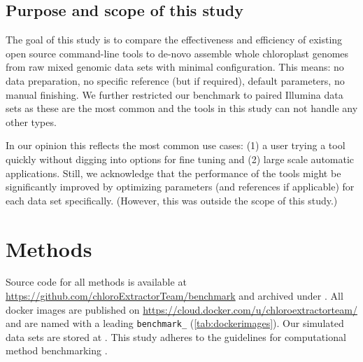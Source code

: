 \documentclass{bmcart}
\newcommand{\zenododataset}{\cite{zenododataset}}
\newcommand{\zenodorepo}{\cite{zenodorepo}}
\begin{document}
\subsection*{Purpose and scope of this study}
The goal of this study is to compare the effectiveness and efficiency of existing open source command-line tools to de-novo assemble whole chloroplast genomes from raw mixed genomic data sets with minimal configuration.
This means: no data preparation, no specific reference (but  if required), default parameters, no manual finishing.
We further restricted our benchmark to paired Illumina data sets as these are the most common  and the %
tools in this study can not handle any other types. 

In our opinion this reflects the most common use cases: (1) a user trying a tool quickly without digging into options for fine tuning and (2) large scale automatic applications.
Still, we acknowledge that the performance of the tools might be significantly improved by optimizing parameters (and references if applicable) for each data set specifically.
(However, this was outside the scope of this study.)


\section*{Methods}
Source code for all methods is available at \url{https://github.com/chloroExtractorTeam/benchmark} and archived under \zenodorepo{}.
All docker images are published on \url{https://cloud.docker.com/u/chloroextractorteam/} and are named with a leading \texttt{benchmark\_} (\cref{tab:dockerimages}).
Our simulated data sets are stored at \zenododataset{}.
This study adheres to the guidelines for computational method benchmarking \cite{weber_essential_2018}.
\end{document}
